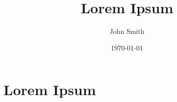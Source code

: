 \documentclass{article}
\title{Lorem Ipsum}
\author{John Smith}
\date{\today}
\begin{document}
\maketitle

\begin{abstract}
    \lipsum[1]
\end{abstract}

\section{Lorem Ipsum}

\lipsum[1-2]
\end{document}
